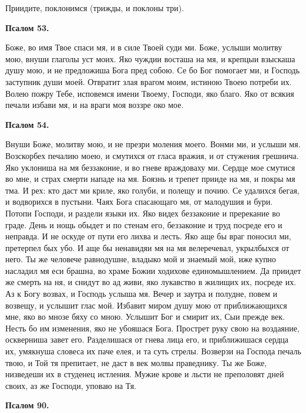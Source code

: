 Приидите, поклонимся (трижды, и поклоны три).


\medskip


\bfseries Псалом 53.\normalfont{}\nopagebreak


Боже, во имя Твое спаси мя, и в силе Твоей суди ми. Боже, услыши молитву мою, внуши глаголы уст моих. Яко чуждии восташа на мя, и крепцыи взыскаша душу мою, и не предложиша Бога пред собою. Се бо Бог помогает ми, и Господь заступник души моей. Отвратит злая врагом моим, истиною Твоею потреби их. Волею пожру Тебе, исповемся имени Твоему, Господи, яко благо. Яко от всякия печали избави мя, и на враги моя воззре око мое.


\medskip


\bfseries Псалом 54.\normalfont{}\nopagebreak


Внуши Боже, молитву мою, и не презри моления моего. Вонми ми, и услыши мя. Возскорбех печалию моею, и смутихся от гласа вражия, и от стужения грешнича. Яко уклониша на мя беззаконие, и во гневе враждоваху ми. Сердце мое смутися во мне, и страх смерти нападе на мя. Боязнь и трепет прииде на мя, и покры мя тма. И рех: кто даст ми криле, яко голуби, и полещу и почию. Се удалихся бегая, и водворихся в пустыни. Чаях Бога спасающаго мя, от малодушия и бури. Потопи Господи, и раздели языки их. Яко видех беззаконие и пререкание во граде. День и нощь обыдет и по стенам его, беззаконие и труд посреде его и неправда. И не оскуде от пути его лихва и лесть. Яко аще бы враг поносил ми, претерпел бых убо. И аще бы ненавидяи мя на мя велеречевал, укрылбыхся от него. Ты же человече равнодушне, владыко мой и знаемый мой, иже купно насладил мя еси брашна, во храме Божии ходихове единомышлением. Да приидет же смерть на ня, и снидут во ад живи, яко лукавство в жилищих их, посреде их. Аз к Богу возвах, и Господь услыша мя. Вечер и заутра и полудне, повем и возвещу, и услышит глас мой. Избавит миром душу мою от приближающихся мне, яко во мнозе бяху со мною. Услышит Бог и смирит их, Сыи прежде век. Несть бо им изменения, яко не убояшася Бога. Прострет руку свою на воздаяние, оскверниша завет его. Разделишася от гнева лица его, и приближишася сердца их, умякнуша словеса их паче елея, и та суть стрелы. Возверзи на Господа печаль твою, и Той тя препитает, не даст в век молвы праведнику. Ты же Боже, низведеши их в студенец истления. Мужие крове и льсти не преполовят дней своих, аз же Господи, уповаю на Тя.


\medskip


\bfseries Псалом 90. \normalfont{}\nopagebreak


